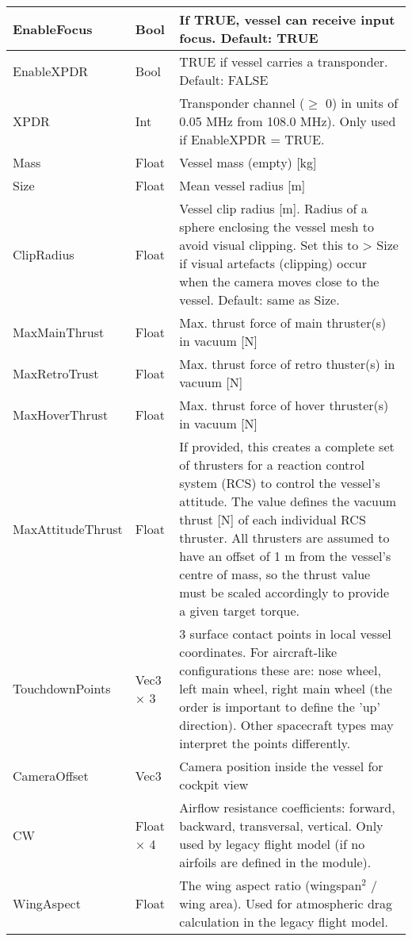 \documentclass[Orbiter Developer Manual.tex]{subfiles}
\begin{document}
\begin{longtable}{ |p{}|p{}|p{}| }
	EnableFocus & Bool & If TRUE, vessel can receive input focus. Default: TRUE\\
	\hline\rule{0pt}{2ex}
	EnableXPDR & Bool & TRUE if vessel carries a transponder. Default: FALSE\\
	\hline\rule{0pt}{2ex}
	XPDR & Int & Transponder channel ($\geq$ 0) in units of 0.05 MHz from 108.0 MHz). Only used if EnableXPDR = TRUE.\\
	\hline\rule{0pt}{2ex}
	Mass & Float & Vessel mass (empty) [kg]\\
	\hline\rule{0pt}{2ex}
	Size & Float & Mean vessel radius [m]\\
	\hline\rule{0pt}{2ex}
	ClipRadius & Float & Vessel clip radius [m]. Radius of a sphere enclosing the vessel mesh to avoid visual clipping. Set this to > Size if visual artefacts (clipping) occur when the camera moves close to the vessel. Default: same as Size.\\
	\hline\rule{0pt}{2ex}
	MaxMainThrust & Float & Max. thrust force of main thruster(s) in vacuum [N]\\
	\hline\rule{0pt}{2ex}
	MaxRetroTrust & Float & Max. thrust force of retro thuster(s) in vacuum [N]\\
	\hline\rule{0pt}{2ex}
	MaxHoverThrust & Float & Max. thrust force of hover thruster(s) in vacuum [N]\\
	\hline\rule{0pt}{2ex}
	MaxAttitudeThrust & Float & If provided, this creates a complete set of thrusters for a reaction control system (RCS) to control the vessel's attitude. The value defines the vacuum thrust [N] of each individual RCS thruster. All thrusters are assumed to have an offset of 1 m from the vessel's centre of mass, so the thrust value must be scaled accordingly to provide a given target torque.\\
	\hline\rule{0pt}{2ex}
	TouchdownPoints & Vec3 × 3 & 3 surface contact points in local vessel coordinates. For aircraft-like configurations these are: nose wheel, left main wheel, right main wheel (the order is important to define the 'up' direction). Other spacecraft types may interpret the points differently.\\
	\hline\rule{0pt}{2ex}
	CameraOffset & Vec3 & Camera position inside the vessel for cockpit view\\
	\hline\rule{0pt}{2ex}
	CW & Float × 4 & Airflow resistance coefficients: forward, backward, transversal, vertical. Only used by legacy flight model (if no airfoils are defined in the module).\\
	\hline\rule{0pt}{2ex}
	WingAspect & Float & The wing aspect ratio (wingspan$^{2}$ / wing area). Used for atmospheric drag calculation in the legacy flight model.\\

\end{longtable}
\end{document}
